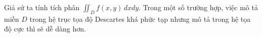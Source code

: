 \documentclass[preview]{standalone}
\begin{document}
\begin{center}
Giả sử ta tính tích phân $\iint_D f(x, y)\,dxdy$. Trong một số trường hợp, việc mô tả miền $D$ trong hệ trục tọa độ Descartes khá phức tạp nhưng mô tả trong hệ tọa độ cực thì sẽ dễ dàng hơn.
\end{center}
\end{document}
